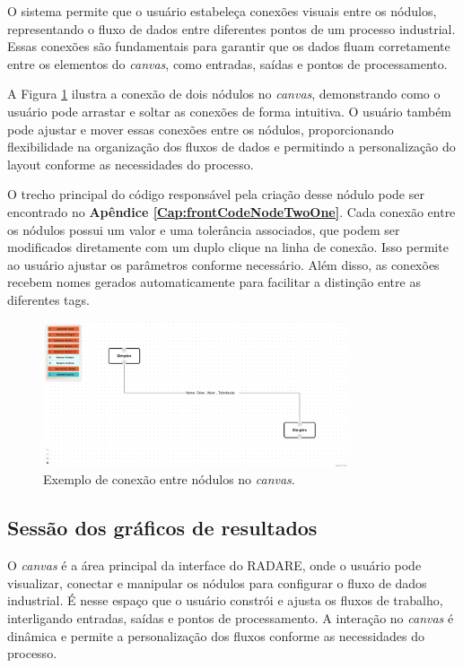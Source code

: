 O sistema permite que o usuário estabeleça conexões visuais entre os nódulos, representando o fluxo de dados entre diferentes pontos de um processo industrial. Essas conexões são fundamentais para garantir que os dados fluam corretamente entre os elementos do \textit{canvas}, como entradas, saídas e pontos de processamento.

A Figura \ref{Fig:NodeConnections} ilustra a conexão de dois nódulos no \textit{canvas}, demonstrando como o usuário pode arrastar e soltar as conexões de forma intuitiva. O usuário também pode ajustar e mover essas conexões entre os nódulos, proporcionando flexibilidade na organização dos fluxos de dados e permitindo a personalização do layout conforme as necessidades do processo.

O trecho principal do código responsável pela criação desse nódulo pode ser encontrado no \textbf{Apêndice \ref{Cap:frontCodeNodeTwoOne}}. Cada conexão entre os nódulos possui um valor e uma tolerância associados, que podem ser modificados diretamente com um duplo clique na linha de conexão. Isso permite ao usuário ajustar os parâmetros conforme necessário. Além disso, as conexões recebem nomes gerados automaticamente para facilitar a distinção entre as diferentes tags.

\begin{figure}[htbp]
    \centering
    \includegraphics[width=0.8\textwidth]{figuras/node-connection-example.png}
    \caption{Exemplo de conexão entre nódulos no \textit{canvas}.}
    \label{Fig:NodeConnections}
\end{figure}


\subsection{Sessão dos gráficos de resultados}

O \textit{canvas} é a área principal da interface do RADARE, onde o usuário pode visualizar, conectar e manipular os nódulos para configurar o fluxo de dados industrial. É nesse espaço que o usuário constrói e ajusta os fluxos de trabalho, interligando entradas, saídas e pontos de processamento. A interação no \textit{canvas} é dinâmica e permite a personalização dos fluxos conforme as necessidades do processo.

